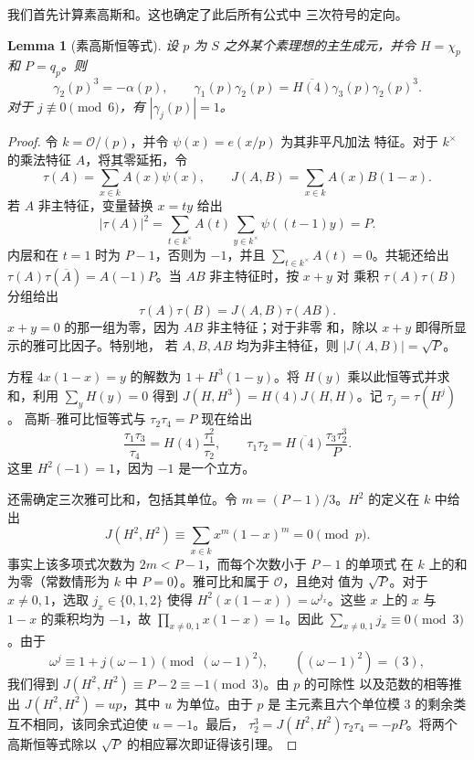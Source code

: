 \documentclass[11pt,a4paper]{article}
\numberwithin{equation}{section}
\numberwithin{figure}{section}
\newtheorem{lemma}[theorem]{Lemma}
\theoremstyle{definition}
\theoremstyle{remark}
\begin{document}
我们首先计算素高斯和。这也确定了此后所有公式中
三次符号的定向。

\begin{lemma}[素高斯恒等式]\label{lem:prime-gauss-identities}
设 $p$ 为 $S$ 之外某个素理想的主生成元，并令
$H=\chi_p$ 和 $P=q_p$。则
\[
 \gamma_2(p)^3=-\alpha(p),\qquad
 \gamma_1(p)\gamma_2(p)
   =\overline{H(4)}\gamma_3(p)\gamma_2(p)^3.
\]
对于 $j\not\equiv0\pmod6$，有 $|\gamma_j(p)|=1$。
\end{lemma}

\begin{proof}
令 $k=\mathcal O/(p)$，并令 $\psi(x)=e(x/p)$ 为其非平凡加法
特征。对于 $k^\times$ 的乘法特征 $A$，将其零延拓，令
\[
 \tau(A)=\sum_{x\in k}A(x)\psi(x),\qquad
 J(A,B)=\sum_{x\in k}A(x)B(1-x).
\]
若 $A$ 非主特征，变量替换 $x=ty$ 给出
\[
 |\tau(A)|^2
 =\sum_{t\in k^\times}A(t)\sum_{y\in k^\times}\psi((t-1)y)=P.
\]
内层和在 $t=1$ 时为 $P-1$，否则为 $-1$，并且
$\sum_{t\in k^\times}A(t)=0$。共轭还给出
$\tau(A)\tau(\overline A)=A(-1)P$。当 $AB$ 非主特征时，按 $x+y$ 对
乘积 $\tau(A)\tau(B)$ 分组给出
\[
 \tau(A)\tau(B)=J(A,B)\tau(AB).
\]
$x+y=0$ 的那一组为零，因为 $AB$ 非主特征；对于非零
和，除以 $x+y$ 即得所显示的雅可比因子。特别地，
若 $A,B,AB$ 均为非主特征，则 $|J(A,B)|=\sqrt P$。

方程 $4x(1-x)=y$ 的解数为 $1+H^3(1-y)$。将 $H(y)$
乘以此恒等式并求和，利用 $\sum_yH(y)=0$ 得到
$J(H,H^3)=H(4)J(H,H)$。记 $\tau_j=\tau(H^j)$。
高斯--雅可比恒等式与 $\tau_2\tau_4=P$ 现在给出
\[
 \frac{\tau_1\tau_3}{\tau_4}
   =H(4)\frac{\tau_1^2}{\tau_2},\qquad
 \tau_1\tau_2=\overline{H(4)}\frac{\tau_3\tau_2^3}{P}.
\]
这里 $H^2(-1)=1$，因为 $-1$ 是一个立方。

还需确定三次雅可比和，包括其单位。令
$m=(P-1)/3$。$H^2$ 的定义在 $k$ 中给出
\[
 J(H^2,H^2)\equiv\sum_{x\in k}x^m(1-x)^m=0\pmod p.
\]
事实上该多项式次数为 $2m<P-1$，而每个次数小于 $P-1$ 的单项式
在 $k$ 上的和为零（常数情形为
$k$ 中 $P=0$）。雅可比和属于 $\mathcal O$，且绝对
值为 $\sqrt P$。对于 $x\ne0,1$，选取 $j_x\in\{0,1,2\}$ 使得
$H^2(x(1-x))=\omega^{j_x}$。这些 $x$ 上的 $x$ 与 $1-x$ 的乘积均为
$-1$，故 $\prod_{x\ne0,1}x(1-x)=1$。因此
$\sum_{x\ne0,1}j_x\equiv0\pmod3$。由于
\[
 \omega^j\equiv1+j(\omega-1)\pmod{(\omega-1)^2},
 \qquad ((\omega-1)^2)=(3),
\]
我们得到 $J(H^2,H^2)\equiv P-2\equiv-1\pmod3$。由 $p$ 的可除性
以及范数的相等推出 $J(H^2,H^2)=up$，其中 $u$ 为单位。由于 $p$ 是
主元素且六个单位模 $3$ 的剩余类互不相同，该同余式迫使 $u=-1$。最后，
$\tau_2^3=J(H^2,H^2)\tau_2\tau_4=-pP$。将两个高斯恒等式除以
$\sqrt P$ 的相应幂次即证得该引理。
\end{proof}
\end{document}

